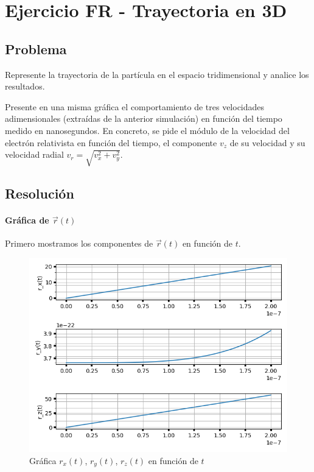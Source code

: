 \section{Ejercicio FR - Trayectoria en 3D}

\subsection{Problema}

Represente la trayectoria de la partícula en el espacio tridimensional y analice los resultados.

Presente en una misma gráfica el comportamiento de tres velocidades adimensionales (extraídas de la anterior simulación) en función del tiempo medido en nanosegundos. En concreto, se pide el módulo de la velocidad del electrón relativista en función del tiempo, el componente $v_z$ de su velocidad y su velocidad radial $v_r = \sqrt{ v_x^2 + v_y^2}$. 

\subsection{Resolución}

\paragraph{Gráfica de $\vec{r}(t)$} 
Primero mostramos los componentes de $\vec{r}(t)$ en función de $t$.

\begin{figure}[H]
	\includegraphics[width=\linewidth]{figures/rel_rx_ry_rz.png}
	\caption{Gráfica $r_x(t)$, $r_y(t)$, $r_z(t)$ en función de $t$}
	\label{fig:rel_rx_ry_rz_t}
\end{figure}


